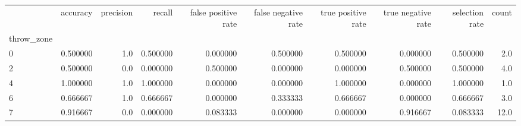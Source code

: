 \begin{tabular}{lrrrrrrrrr}
\toprule
{} &  accuracy &  precision &    recall &  false positive rate &  false negative rate &  true positive rate &  true negative rate &  selection rate &  count \\
throw\_zone &           &            &           &                      &                      &                     &                     &                 &        \\
\midrule
0          &  0.500000 &        1.0 &  0.500000 &             0.000000 &             0.500000 &            0.500000 &            0.000000 &        0.500000 &    2.0 \\
2          &  0.500000 &        0.0 &  0.000000 &             0.500000 &             0.000000 &            0.000000 &            0.500000 &        0.500000 &    4.0 \\
4          &  1.000000 &        1.0 &  1.000000 &             0.000000 &             0.000000 &            1.000000 &            0.000000 &        1.000000 &    1.0 \\
6          &  0.666667 &        1.0 &  0.666667 &             0.000000 &             0.333333 &            0.666667 &            0.000000 &        0.666667 &    3.0 \\
7          &  0.916667 &        0.0 &  0.000000 &             0.083333 &             0.000000 &            0.000000 &            0.916667 &        0.083333 &   12.0 \\
\bottomrule
\end{tabular}
